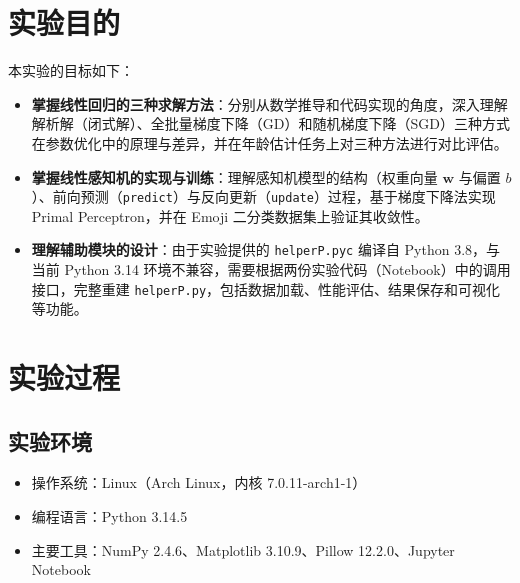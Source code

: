 \documentclass[12pt,a4paper]{ctexart}
\title{\reporttitle}
\author{\authname：\underline{李祥熙} \quad \authid：\underline{2234412799} \quad \class：\underline{计算机2301}}
\date{}
\begin{document}
\maketitle
\tableofcontents
\newpage

\section{实验目的}

本实验的目标如下：

\begin{itemize}
  \item \textbf{掌握线性回归的三种求解方法}：分别从数学推导和代码实现的角度，深入理解解析解（闭式解）、全批量梯度下降（GD）和随机梯度下降（SGD）三种方式在参数优化中的原理与差异，并在年龄估计任务上对三种方法进行对比评估。
  \item \textbf{掌握线性感知机的实现与训练}：理解感知机模型的结构（权重向量 $\mathbf{w}$ 与偏置 $b$）、前向预测（\texttt{predict}）与反向更新（\texttt{update}）过程，基于梯度下降法实现 Primal Perceptron，并在 Emoji 二分类数据集上验证其收敛性。
  \item \textbf{理解辅助模块的设计}：由于实验提供的 \texttt{helperP.pyc} 编译自 Python 3.8，与当前 Python 3.14 环境不兼容，需要根据两份实验代码（Notebook）中的调用接口，完整重建 \texttt{helperP.py}，包括数据加载、性能评估、结果保存和可视化等功能。
\end{itemize}

\section{实验过程}

\subsection{实验环境}

\begin{itemize}
  \item 操作系统：Linux（Arch Linux，内核 7.0.11-arch1-1）
  \item 编程语言：Python 3.14.5
  \item 主要工具：NumPy 2.4.6、Matplotlib 3.10.9、Pillow 12.2.0、Jupyter Notebook
\end{itemize}
\end{document}
